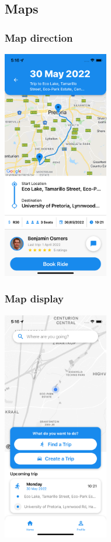 \documentclass[hidelinks, 12pt, a4paper]{article}
\begin{document}
\subsection{Maps}
\subsubsection{Map direction}
\begin{center}
  \includegraphics[height=10cm]{images/map_directions.png}
\end{center}
\subsubsection{Map display}
\begin{center}
  \includegraphics[height=10cm]{images/map_display.png}
\end{center}
\vspace{1cm}
\end{document}

